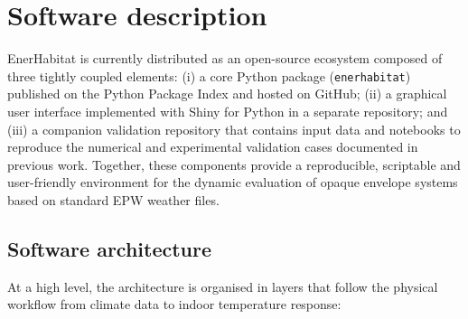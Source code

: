\documentclass[preprint,12pt, a4paper]{elsarticle}
\begin{document}
\section{Software description}




EnerHabitat is currently distributed as an open-source ecosystem composed of three tightly coupled elements: (i) a core Python package (\texttt{enerhabitat}) published on the Python Package Index and hosted on GitHub; (ii) a graphical user interface implemented with Shiny for Python in a separate repository; and (iii) a companion validation repository that contains input data and notebooks to reproduce the numerical and experimental validation cases documented in previous work. Together, these components provide a reproducible, scriptable and user-friendly environment for the dynamic evaluation of opaque envelope systems based on standard EPW weather files.

\subsection{Software architecture}

At a high level, the architecture is organised in layers that follow the physical workflow from climate data to indoor temperature response:
\end{document}
